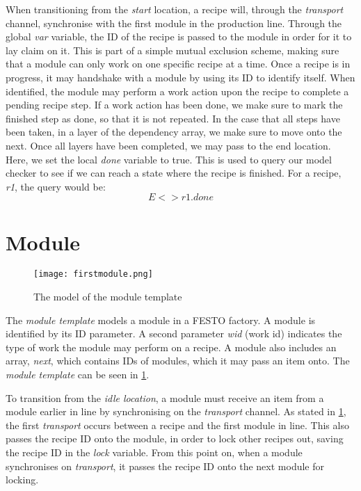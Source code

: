 When transitioning from the \emph{start} location, a recipe will, through the \emph{transport} channel, synchronise with the first module in the production line. Through the global \emph{var} variable, the ID of the recipe is passed to the module in order for it to lay claim on it. This is part of a simple mutual exclusion scheme, making sure that a module can only work on one specific recipe at a time. Once a recipe is in progress, it may handshake with a module by using its ID to identify itself. When identified, the module may perform a work action upon the recipe to complete a pending recipe step. If a work action has been done, we make sure to mark the finished step as done, so that it is not repeated. In the case that all steps have been taken, in a layer of the dependency array, we make sure to move onto the next. Once all layers have been completed, we may pass to the end location. Here, we set the local \emph{done} variable to true. This is used to query our model checker to see if we can reach a state where the recipe is finished. For a recipe, \emph{r1}, the query would be: \[E<> r1.done\]

\section{Module}
\label{subs:module}

\begin{figure}[h]
\centering
\texttt{[image: firstmodule.png]}
\caption{The model of the module template}
\label{fig:firstmodule}
\end{figure}

The \emph{module template} models a module in a FESTO factory. A module is identified by its ID parameter. A second parameter \emph{wid} (work id) indicates the type of work the module may perform on a recipe. A module also includes an array, \emph{next}, which contains IDs of modules, which it may pass an item onto. The \emph{module template} can be seen in \cref{fig:firstmodule}.


To transition from the \emph{idle location}, a module must receive an item from a module earlier in line by synchronising on the \emph{transport} channel.
As stated in \cref{subs:module}, the first \emph{transport} occurs between a recipe and the first module in line. This also passes the recipe ID onto the module, in order to lock other recipes out, saving the recipe ID in the \emph{lock} variable. From this point on, when a module synchronises on \emph{transport}, it passes the recipe ID onto the next module for locking.

